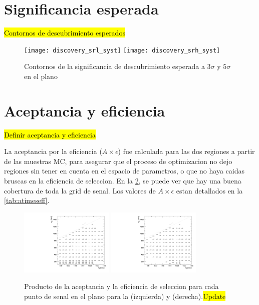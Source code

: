 \section{Significancia esperada}


\hl{Contornos de descubrimiento esperados}

\begin{figure}[!htbp]
  \centering

  \texttt{[image: discovery\_srl\_syst]}
  \texttt{[image: discovery\_srh\_syst]}

  \caption{Contornos de la significancia de descubrimiento esperada a $3\sigma$ y $5\sigma$ en el plano {\mgmn}}

  \label{fig:opt_discovery_exp}
\end{figure}


\section{Aceptancia y eficiencia}

\hl{Definir aceptancia y eficiencia}

La aceptancia por la eficiencia ($A\times\epsilon$) fue calculada para las dos
regiones a partir de las muestras MC, para asegurar que el proceso de
optimizacion no dejo regiones sin tener en cuenta en el espacio de parametros, o
que no haya caidas bruscas en la eficiencia de seleccion. En la
\cref{fig:atimeseff}, se puede ver que hay una buena cobertura de toda la grid
de senal. Los valores de $A\times\epsilon$ estan detallados en la
\cref{tab:atimeseff}.

\begin{figure}[!htbp]
  \centering
  \includegraphics[width=0.4\textwidth]{figures/acceptance_srl}
  \hspace{1cm}%
  \includegraphics[width=0.4\textwidth]{figures/acceptance_srh}
  \caption{Producto de la aceptancia y la eficiencia de seleccion para cada punto de senal
    en el plano {\mgmn} para la {\SRL} (izquierda) y {\SRH} (derecha).\hl{Update}}
  \label{fig:atimeseff}
\end{figure}


